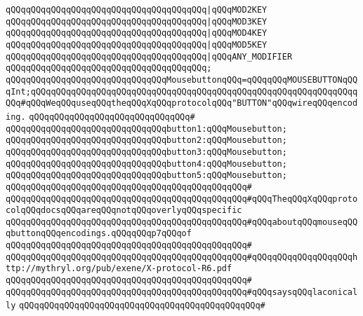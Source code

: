 \verb|qQQqqQQqqQQqqQQqqQQqqQQqqQQqqQQqqQQqqQQq|\verb#|qQQqMOD2KEY#\newline
\verb|qQQqqQQqqQQqqQQqqQQqqQQqqQQqqQQqqQQqqQQq|\verb#|qQQqMOD3KEY#\newline
\verb|qQQqqQQqqQQqqQQqqQQqqQQqqQQqqQQqqQQqqQQq|\verb#|qQQqMOD4KEY#\newline
\verb|qQQqqQQqqQQqqQQqqQQqqQQqqQQqqQQqqQQqqQQq|\verb#|qQQqMOD5KEY#\newline
\verb|qQQqqQQqqQQqqQQqqQQqqQQqqQQqqQQqqQQqqQQq|\verb#|qQQqANY_MODIFIER#\newline
\verb|qQQqqQQqqQQqqQQqqQQqqQQqqQQqqQQqqQQqqQQq;|\newline
\newline
\verb|qQQqqQQqqQQqqQQqqQQqqQQqqQQqqQQqMousebuttonqQQq=qQQqqQQqMOUSEBUTTONqQQqInt;qQQqqQQqqQQqqQQqqQQqqQQqqQQqqQQqqQQqqQQqqQQqqQQqqQQqqQQqqQQqqQQqqQQq#qQQqWeqQQquseqQQqtheqQQqXqQQqprotocolqQQq"BUTTON"qQQqwireqQQqencoding.|\newline
\verb|qQQqqQQqqQQqqQQqqQQqqQQqqQQqqQQq#|\newline
\verb|qQQqqQQqqQQqqQQqqQQqqQQqqQQqqQQqbutton1:qQQqMousebutton;|\newline
\verb|qQQqqQQqqQQqqQQqqQQqqQQqqQQqqQQqbutton2:qQQqMousebutton;|\newline
\verb|qQQqqQQqqQQqqQQqqQQqqQQqqQQqqQQqbutton3:qQQqMousebutton;|\newline
\verb|qQQqqQQqqQQqqQQqqQQqqQQqqQQqqQQqbutton4:qQQqMousebutton;|\newline
\verb|qQQqqQQqqQQqqQQqqQQqqQQqqQQqqQQqbutton5:qQQqMousebutton;|\newline
\verb|qQQqqQQqqQQqqQQqqQQqqQQqqQQqqQQqqQQqqQQqqQQqqQQq#|\newline
\verb|qQQqqQQqqQQqqQQqqQQqqQQqqQQqqQQqqQQqqQQqqQQqqQQq#qQQqTheqQQqXqQQqprotocolqQQqdocsqQQqareqQQqnotqQQqoverlyqQQqspecific|\newline
\verb|qQQqqQQqqQQqqQQqqQQqqQQqqQQqqQQqqQQqqQQqqQQqqQQq#qQQqaboutqQQqmouseqQQqbuttonqQQqencodings.qQQqqQQqp7qQQqof|\newline
\verb|qQQqqQQqqQQqqQQqqQQqqQQqqQQqqQQqqQQqqQQqqQQqqQQq#|\newline
\verb|qQQqqQQqqQQqqQQqqQQqqQQqqQQqqQQqqQQqqQQqqQQqqQQq#qQQqqQQqqQQqqQQqqQQqhttp://mythryl.org/pub/exene/X-protocol-R6.pdf|\newline
\verb|qQQqqQQqqQQqqQQqqQQqqQQqqQQqqQQqqQQqqQQqqQQqqQQq#|\newline
\verb|qQQqqQQqqQQqqQQqqQQqqQQqqQQqqQQqqQQqqQQqqQQqqQQq#qQQqsaysqQQqlaconically|\newline
\verb|qQQqqQQqqQQqqQQqqQQqqQQqqQQqqQQqqQQqqQQqqQQqqQQq#|\newline
